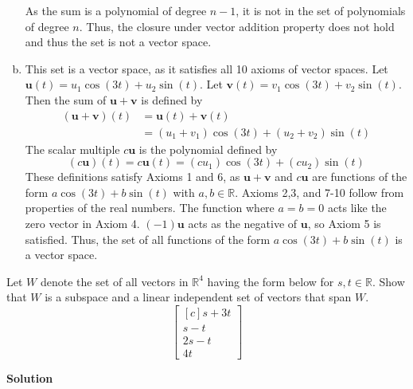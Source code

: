 \documentclass[11pt]{scrartcl}
\theoremstyle{dotlessP}
\theoremstyle{dotlessN}
\newcommand{\reals}{\mathbb{R}} %
\begin{document}
\begin{enumerate}[a)]
		As the sum is a polynomial of degree $n-1$, it is not in the set of polynomials of degree $n$. Thus, the closure under vector addition property does not hold and thus the set is not a vector space.
	\item This set is a vector space, as it satisfies all 10 axioms of vector spaces. Let $\mathbf{u}(t) = u_1 \cos(3t) + u_2 \sin(t)$. Let $\mathbf{v}(t) = v_1 \cos(3t) + v_2 \sin(t)$. Then the sum of $\mathbf{u} + \mathbf{v}$ is defined by
		\begin{align*}
			(\mathbf{u}+\mathbf{v})(t) &= \mathbf{u}(t) + \mathbf{v}(t) \\
									   &= (u_1 + v_1)\cos(3t) + (u_2 + v_2)\sin(t)
		\end{align*}
		The scalar multiple $c\mathbf{u}$ is the polynomial defined by
		\[
		(c\mathbf{u})(t) = c\mathbf{u}(t) = (cu_1) \cos(3t) + (cu_2) \sin(t)
		\] 
		These definitions satisfy Axioms 1 and 6, as $\mathbf{u} + \mathbf{v}$ and $c\mathbf{u}$ are functions of the form $a \cos(3t) + b\sin(t)$ with $a,b \in \reals$. Axioms 2,3, and 7-10 follow from properties of the real numbers. The function where $a = b = 0$ acts like the zero vector in Axiom 4. $(-1)\mathbf{u}$ acts as the negative of $\mathbf{u}$, so Axiom 5 is satisfied. Thus, the set of all functions of the form $a\cos(3t) + b\sin(t)$ is a vector space.
\end{enumerate}
\begin{ques}
	Let $W$ denote the set of all vectors in $\reals^4$ having the form below for $s, t \in \reals$. Show that $W$ is a subspace and a linear independent set of vectors that span $W$.
	\[
		\begin{bmatrix}[c]
		s + 3t \\
		s - t \\
		2s - t\\
		4t
	\end{bmatrix}
	\] 
\end{ques}
	\textbf{Solution}
\end{document}
